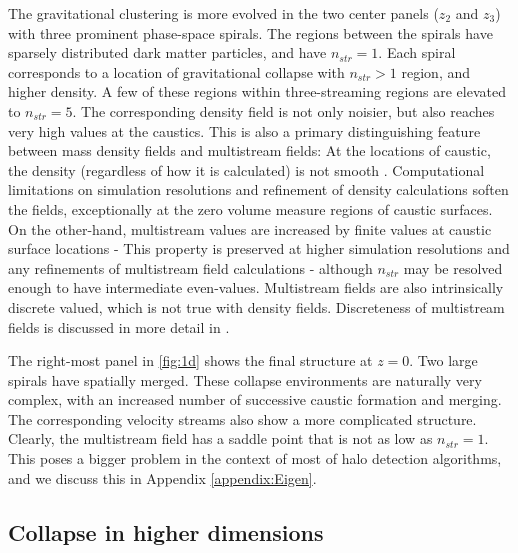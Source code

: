 \documentclass[fleqn,usenatbib,useAMS]{mnras}
\newcommand\ghl{\bgroup\markoverwith
  {\textcolor{green}{\rule[-.5ex]{2pt}{2.5ex}}}\ULon}
\begin{document}
The gravitational clustering is more evolved in the two center panels ($z_2$ and $z_3$) with three prominent phase-space spirals. The regions between the spirals have sparsely distributed dark matter particles, and have $n_{str} = 1$. Each spiral corresponds to a location of gravitational collapse with $n_{str} > 1$ region, and higher density. A few of these regions within three-streaming regions are elevated to $n_{str} = 5$. The corresponding density field is not only noisier, but also reaches very high values at the caustics. This is also a primary distinguishing feature between mass density fields and multistream fields: At the locations of caustic, the density (regardless of how it is calculated) is not smooth \cite{Vogelsberger2011}. Computational limitations on simulation resolutions and refinement of density calculations soften the fields, exceptionally at the zero volume measure regions of caustic surfaces.  On the other-hand, multistream values are increased by finite values at caustic surface locations - This property is preserved at higher simulation resolutions and any refinements of multistream field calculations - although $n_{str}$ may be resolved enough to have intermediate even-values. Multistream fields are also intrinsically discrete valued, which is not true with density fields. Discreteness of multistream fields is discussed in more detail in \cite{Ramachandra2017}. 

The right-most panel in \autoref{fig:1d} shows the final structure at $z=0$. Two large spirals have spatially merged. These collapse environments are naturally very complex, with an increased number of successive caustic formation and merging. 
The corresponding velocity streams also show a more complicated structure. Clearly, the multistream field has a saddle point that is not as low as $n_{str} = 1$. %
This poses a bigger problem in the context of most of halo detection algorithms, and we discuss this in Appendix \ref{appendix:Eigen}. 


\subsection{Collapse in higher dimensions}
\end{document}
